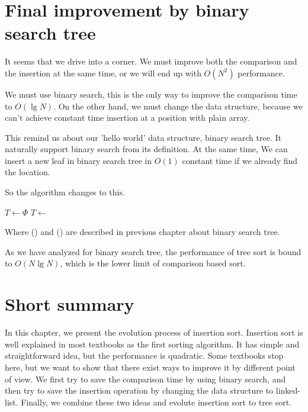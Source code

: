 \documentclass{article}
\begin{document}
\section{Final improvement by binary search tree}

It seems that we drive into a corner. We must improve both the comparison 
and the insertion at the same time, or we will end up with $O(N^2)$ performance.

We must use binary search, this is the only way to improve the comparison
time to $O(\lg N)$. On the other hand, we must change the data structure, 
because we can't achieve constant time insertion at a position with 
plain array.

This remind us about our 'hello world' data structure, binary search tree.
It naturally support binary search from its definition. At the same time,
We can insert a new leaf in binary search tree in $O(1)$ constant time
if we already find the location.

So the algorithm changes to this.

\begin{algorithmic}
  \State $T \gets \Phi$
    \State $T \gets $ 
  \EndFor
  \State \Return {}
\EndFunction
\end{algorithmic}

Where () and () are described in 
previous chapter about binary search tree.

As we have analyzed for binary search tree, the performance of tree sort
is bound to $O(N \lg N)$, which is the lower limit of comparison based 
sort\cite{Knuth}.

\section{Short summary} 
In this chapter, we present the evolution process of insertion sort. Insertion
sort is well explained in most textbooks as the first sorting algorithm.
It has simple and straightforward idea, but the performance is quadratic.
Some textbooks stop here, but we want to show that there exist ways to improve
it by different point of view. We first try to save the comparison time
by using binary search, and then try to save the insertion operation by
changing the data structure to linked-list. Finally, we combine these
two ideas and evolute insertion sort to tree sort.
\end{document}

